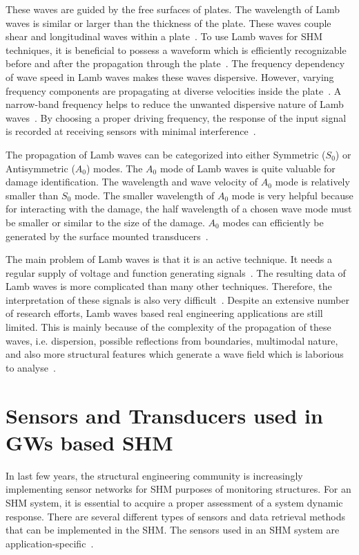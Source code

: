 \documentclass[b5paper, 11pt, titlepage]{book}
\begin{document}
These waves are guided by the free surfaces of plates. The wavelength of Lamb waves is similar or larger than the thickness of the plate. These waves couple shear and longitudinal waves within a plate~\cite{Farrar2012}. To use Lamb waves for SHM techniques, it is beneficial to possess a waveform which is efficiently recognizable before and after the propagation through the plate~\cite{Farrar2012}. The frequency dependency of wave speed in Lamb waves makes these waves dispersive. However, varying frequency components are propagating at diverse velocities inside the plate~\cite{Farrar2012}. A narrow-band frequency helps to reduce the unwanted dispersive nature of Lamb waves~\cite{Kessler2002}. By choosing a proper driving frequency, the response of the input signal is recorded at receiving sensors with minimal interference~\cite{Farrar2012}.

The propagation of Lamb waves can be categorized into either Symmetric ($S_0$) or Antisymmetric ($A_0$) modes. The $A_0$ mode of Lamb waves is quite valuable for damage identification. The wavelength and wave velocity of $A_0$ mode is relatively smaller than $S_0$ mode. The smaller wavelength of $A_0$ mode is very helpful because for interacting with the damage, the half wavelength of a chosen wave mode must be smaller or similar to the size of the damage. $A_0$ modes can efficiently be generated by the surface mounted transducers~\cite{Ricci2016}.  

The main problem of Lamb waves is that it is an active technique. It needs a regular supply of voltage and function generating signals~\cite{MMaia, Kessler2002}. The resulting data of Lamb waves is more complicated than many other techniques. Therefore, the interpretation of these signals is also very difficult~\cite{Kessler2002}. Despite an extensive number of research efforts, Lamb waves based real engineering applications are still limited. This is mainly because of the complexity of the propagation of these waves, i.e. dispersion, possible reflections from boundaries, multimodal nature, and also more structural features which generate a wave field which is laborious to analyse~\cite{stepinski2013advanced}.

\section{Sensors and Transducers used in GWs based SHM}
In last few years, the structural engineering community is increasingly implementing sensor networks for SHM purposes of monitoring structures. For an SHM system, it is essential to acquire a proper assessment of a system dynamic response. There are several different types of sensors and data retrieval methods that can be implemented in the SHM. The sensors used in an SHM system are application-specific~\cite{Farrar2012}.
\end{document}
